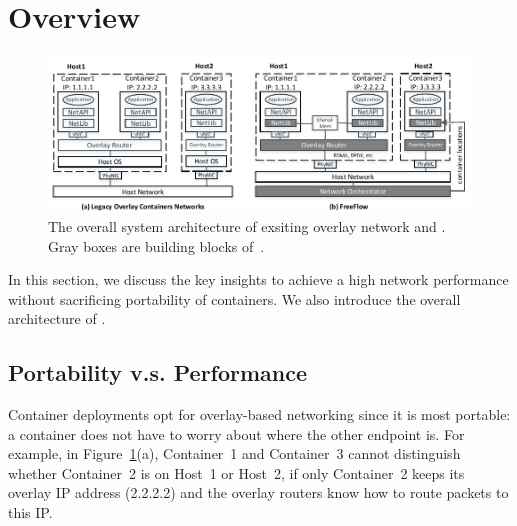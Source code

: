\section{Overview} \label{sec:overview}

\begin{figure}[t!] 
     \centering 
     \includegraphics[width=7in]{figures/system-arch.pdf} 
    \caption{\label{fig:sysarch} The overall system architecture of exsiting overlay network and \sysname. Gray boxes are building blocks of~\sysname.} 
\end{figure} 

In this section, we discuss the key insights to achieve a high network
performance without sacrificing portability of containers. We also 
introduce the overall architecture of \sysname. 


\subsection{Portability v.s. Performance}


Container deployments opt for overlay-based networking since it is most
portable: a container does not have to worry about where the other endpoint is.
For example, in Figure~\ref{fig:sysarch}(a), Container~1 and Container~3 cannot
distinguish whether Container~2 is on Host~1 or Host~2, if only Container~2
keeps its overlay IP address (2.2.2.2) and the overlay routers know how to
route packets to this IP. 

